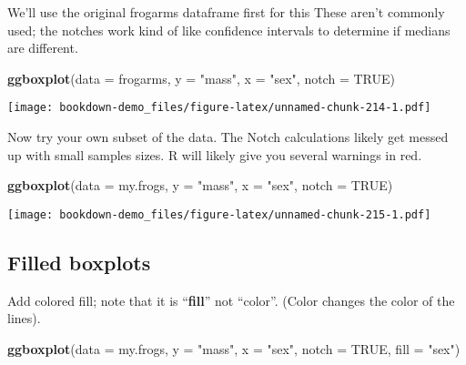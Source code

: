 \documentclass[]{book}
\newenvironment{Shaded}{\begin{snugshade}}{\end{snugshade}}
\newcommand{\KeywordTok}[1]{\textcolor[rgb]{0.13,0.29,0.53}{\textbf{#1}}}
\newcommand{\DataTypeTok}[1]{\textcolor[rgb]{0.13,0.29,0.53}{#1}}
\newcommand{\StringTok}[1]{\textcolor[rgb]{0.31,0.60,0.02}{#1}}
\newcommand{\OtherTok}[1]{\textcolor[rgb]{0.56,0.35,0.01}{#1}}
\newcommand{\NormalTok}[1]{#1}
\theoremstyle{definition}
\theoremstyle{definition}
\theoremstyle{definition}
\theoremstyle{remark}
\begin{document}
We'll use the original frogarms dataframe first for this These aren't
commonly used; the notches work kind of like confidence intervals to
determine if medians are different.

\begin{Shaded}
\begin{Highlighting}[]
\KeywordTok{ggboxplot}\NormalTok{(}\DataTypeTok{data =}\NormalTok{ frogarms,}
          \DataTypeTok{y =} \StringTok{"mass"}\NormalTok{,}
          \DataTypeTok{x =} \StringTok{"sex"}\NormalTok{,}
          \DataTypeTok{notch  =} \OtherTok{TRUE}\NormalTok{) }
\end{Highlighting}
\end{Shaded}

\texttt{[image: bookdown-demo\_files/figure-latex/unnamed-chunk-214-1.pdf]}

Now try your own subset of the data. The Notch calculations likely get
messed up with small samples sizes. R will likely give you several
warnings in red.

\begin{Shaded}
\begin{Highlighting}[]
\KeywordTok{ggboxplot}\NormalTok{(}\DataTypeTok{data =}\NormalTok{ my.frogs,}
          \DataTypeTok{y =} \StringTok{"mass"}\NormalTok{,}
          \DataTypeTok{x =} \StringTok{"sex"}\NormalTok{,}
          \DataTypeTok{notch  =} \OtherTok{TRUE}\NormalTok{)}
\end{Highlighting}
\end{Shaded}

\texttt{[image: bookdown-demo\_files/figure-latex/unnamed-chunk-215-1.pdf]}

\subsection{Filled boxplots}\label{filled-boxplots}

Add colored fill; note that it is ``\textbf{fill}'' not ``color''.
(Color changes the color of the lines).

\begin{Shaded}
\begin{Highlighting}[]
\KeywordTok{ggboxplot}\NormalTok{(}\DataTypeTok{data =}\NormalTok{ my.frogs,}
          \DataTypeTok{y =} \StringTok{"mass"}\NormalTok{,}
          \DataTypeTok{x =} \StringTok{"sex"}\NormalTok{,}
          \DataTypeTok{notch  =} \OtherTok{TRUE}\NormalTok{,}
          \DataTypeTok{fill =} \StringTok{"sex"}\NormalTok{)}
\end{Highlighting}
\end{Shaded}
\end{document}
